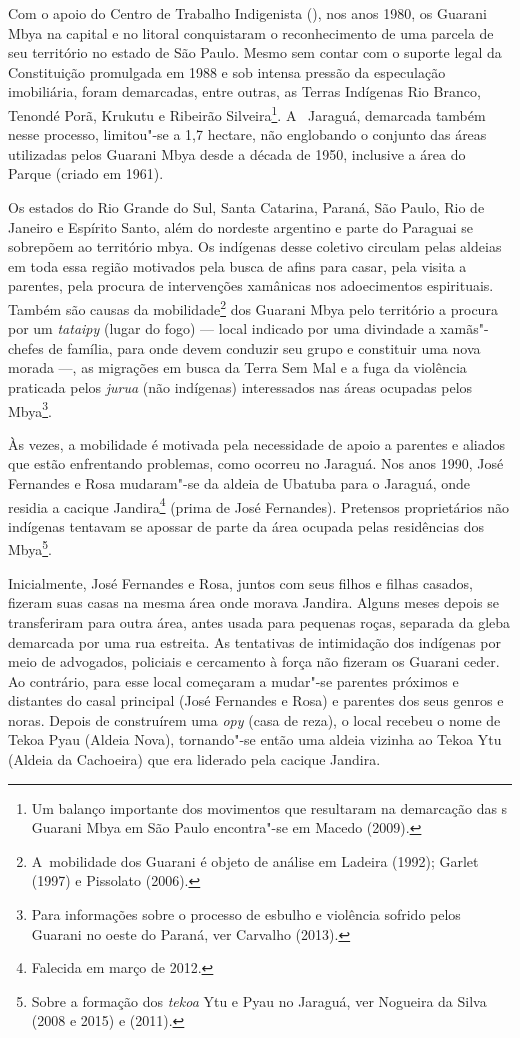 Com o apoio do Centro de Trabalho Indigenista (), nos anos 1980, os
Guarani Mbya na capital e no litoral conquistaram o reconhecimento de
uma parcela de seu território no estado de São Paulo. Mesmo sem contar
com o suporte legal da Constituição promulgada em 1988 e sob intensa
pressão da especulação imobiliária, foram demarcadas, entre outras, as
Terras Indígenas Rio Branco, Tenondé Porã, Krukutu e Ribeirão
Silveira\footnote{Um balanço importante dos movimentos que resultaram
na demarcação das s Guarani Mbya em São Paulo encontra"-se em Macedo
(2009).}. A~ Jaraguá, demarcada também nesse processo, limitou"-se a
1,7 hectare, não englobando o conjunto das áreas utilizadas pelos
Guarani Mbya desde a década de 1950, inclusive a área do Parque (criado
em 1961).

Os estados do Rio Grande do Sul, Santa Catarina, Paraná, São Paulo, Rio
de Janeiro e Espírito Santo, além do nordeste argentino e parte do
Paraguai se sobrepõem ao território mbya. Os indígenas desse coletivo
circulam pelas aldeias em toda essa região motivados pela busca de
afins para casar, pela visita a parentes, pela procura de intervenções
xamânicas nos adoecimentos espirituais. Também são causas da
mobilidade\footnote{A~mobilidade dos Guarani é objeto de análise em
Ladeira (1992); Garlet (1997) e Pissolato (2006).} dos Guarani Mbya
pelo território a procura por um \emph{tataipy} (lugar do fogo) --- local
indicado por uma divindade a xamãs"-chefes de família, para onde devem
conduzir seu grupo e constituir uma nova morada ---, as migrações em
busca da Terra Sem Mal e a fuga da violência praticada pelos \emph{jurua}
(não indígenas) interessados nas áreas ocupadas pelos Mbya\footnote{Para
informações sobre o processo de esbulho e violência sofrido pelos
Guarani no oeste do Paraná, ver Carvalho (2013).}.

Às vezes, a mobilidade é motivada pela necessidade de apoio a parentes e
aliados que estão enfrentando problemas, como ocorreu no Jaraguá. Nos
anos 1990, José Fernandes e Rosa mudaram"-se da aldeia de Ubatuba para o
Jaraguá, onde residia a cacique Jandira\footnote{Falecida em março de
2012.} (prima de José Fernandes). Pretensos proprietários não indígenas
tentavam se apossar de parte da área ocupada pelas residências dos
Mbya\footnote{Sobre a formação dos \emph{tekoa} Ytu e Pyau no Jaraguá, ver
Nogueira da Silva (2008 e 2015) e  (2011).}. 

Inicialmente, José Fernandes e Rosa, juntos com seus filhos e filhas
casados, fizeram suas casas na mesma área onde morava Jandira. Alguns
meses depois se transferiram para outra área, antes usada para pequenas
roças, separada da gleba demarcada por uma rua estreita. As tentativas
de intimidação dos indígenas por meio de advogados, policiais e
cercamento à força não fizeram os Guarani ceder. Ao contrário, para
esse local começaram a mudar"-se parentes próximos e distantes do casal
principal (José Fernandes e Rosa) e parentes dos seus genros e noras.
Depois de construírem uma \emph{opy} (casa de reza), o local recebeu o nome de
Tekoa Pyau (Aldeia Nova), tornando"-se então uma aldeia vizinha ao Tekoa
Ytu (Aldeia da Cachoeira) que era liderado pela cacique Jandira.

